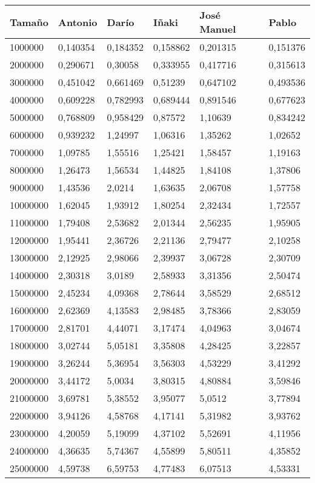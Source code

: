 \begin{tabular}{|l|l|l|l|l|l|}
	\hline
	Tamaño & Antonio & Darío & Iñaki & José Manuel & Pablo \\
	\hline
	\hline
	1000000 & 0,140354 & 0,184352 & 0,158862 & 0,201315 & 0,151376 \\
	\hline
	2000000 & 0,290671 & 0,30058 & 0,333955 & 0,417716 & 0,315613 \\
	\hline
	3000000 & 0,451042 & 0,661469 & 0,51239 & 0,647102 & 0,493536 \\
	\hline
	4000000 & 0,609228 & 0,782993 & 0,689444 & 0,891546 & 0,677623 \\
	\hline
	5000000 & 0,768809 & 0,958429 & 0,87572 & 1,10639 & 0,834242 \\
	\hline
	6000000 & 0,939232 & 1,24997 & 1,06316 & 1,35262 & 1,02652 \\
	\hline
	7000000 & 1,09785 & 1,55516 & 1,25421 & 1,58457 & 1,19163 \\
	\hline
	8000000 & 1,26473 & 1,56534 & 1,44825 & 1,84108 & 1,37806 \\
	\hline
	9000000 & 1,43536 & 2,0214 & 1,63635 & 2,06708 & 1,57758 \\
	\hline
	10000000 & 1,62045 & 1,93912 & 1,80254 & 2,32434 & 1,72557 \\
	\hline
	11000000 & 1,79408 & 2,53682 & 2,01344 & 2,56235 & 1,95905 \\
	\hline
	12000000 & 1,95441 & 2,36726 & 2,21136 & 2,79477 & 2,10258 \\
	\hline
	13000000 & 2,12925 & 2,98066 & 2,39937 & 3,06728 & 2,30709 \\
	\hline
	14000000 & 2,30318 & 3,0189 & 2,58933 & 3,31356 & 2,50474 \\
	\hline
	15000000 & 2,45234 & 4,09368 & 2,78644 & 3,58529 & 2,68512 \\
	\hline
	16000000 & 2,62369 & 4,13583 & 2,98485 & 3,78366 & 2,83059 \\
	\hline
	17000000 & 2,81701 & 4,44071 & 3,17474 & 4,04963 & 3,04674 \\
	\hline
	18000000 & 3,02744 & 5,05181 & 3,35808 & 4,28425 & 3,22857 \\
	\hline
	19000000 & 3,26244 & 5,36954 & 3,56303 & 4,53229 & 3,41292 \\
	\hline
	20000000 & 3,44172 & 5,0034 & 3,80315 & 4,80884 & 3,59846 \\
	\hline
	21000000 & 3,69781 & 5,38552 & 3,95077 & 5,0512 & 3,77894 \\
	\hline
	22000000 & 3,94126 & 4,58768 & 4,17141 & 5,31982 & 3,93762 \\
	\hline
	23000000 & 4,20059 & 5,19099 & 4,37102 & 5,52691 & 4,11956 \\
	\hline
	24000000 & 4,36635 & 5,74367 & 4,55899 & 5,80511 & 4,35852 \\
	\hline
	25000000 & 4,59738 & 6,59753 & 4,77483 & 6,07513 & 4,53331 \\
	\hline
\end{tabular}
